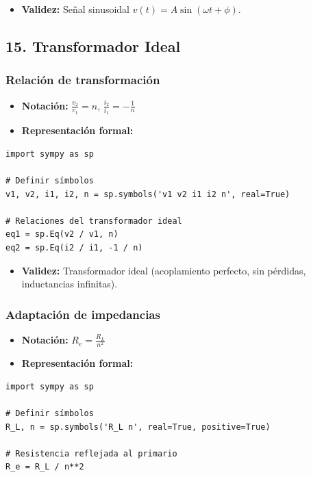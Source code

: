 \documentclass[11pt,a4paper]{article}
\begin{document}
\begin{itemize}[leftmargin=*,topsep=2pt,itemsep=1pt]
  \item \textbf{Validez:} Señal sinusoidal $v(t) = A \sin(\omega t + \phi)$.
\end{itemize}


\subsection*{15. Transformador Ideal}


\subsubsection*{Relación de transformación}


\begin{itemize}[leftmargin=*,topsep=2pt,itemsep=1pt]
  \item \textbf{Notación:} $\frac{v_2}{v_1} = n$, $\frac{i_2}{i_1} = -\frac{1}{n}$
  \item \textbf{Representación formal:}
\end{itemize}


\begin{lstlisting}
import sympy as sp

# Definir símbolos
v1, v2, i1, i2, n = sp.symbols('v1 v2 i1 i2 n', real=True)

# Relaciones del transformador ideal
eq1 = sp.Eq(v2 / v1, n)
eq2 = sp.Eq(i2 / i1, -1 / n)
\end{lstlisting}


\begin{itemize}[leftmargin=*,topsep=2pt,itemsep=1pt]
  \item \textbf{Validez:} Transformador ideal (acoplamiento perfecto, sin pérdidas, inductancias infinitas).
\end{itemize}


\subsubsection*{Adaptación de impedancias}


\begin{itemize}[leftmargin=*,topsep=2pt,itemsep=1pt]
  \item \textbf{Notación:} $R_e = \frac{R_L}{n^2}$
  \item \textbf{Representación formal:}
\end{itemize}


\begin{lstlisting}
import sympy as sp

# Definir símbolos
R_L, n = sp.symbols('R_L n', real=True, positive=True)

# Resistencia reflejada al primario
R_e = R_L / n**2
\end{lstlisting}
\end{document}
